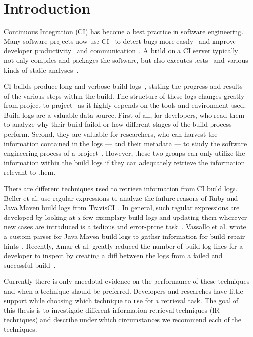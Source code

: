\documentclass[\myrootdir/main.tex]{subfiles}
\begin{document}
\chapter{Introduction}
Continuous Integration (CI) has become a best practice in software engineering.
Many software projects now use CI~\cite{hilton2016usage,staahl2014modeling,beller2017oops} to detect bugs more easily~\cite{vasilescu2015quality,duvall2007continuous} and improve developer productivity~\cite{miller2008hundred,hilton2016usage} and communication~\cite{downs2012ambient}.
A build on a CI server typically not only compiles and packages the software, but also executes tests~\cite{beller2017oops} and various kinds of static analyses~\cite{zampetti2017open}.

CI builds produce long and verbose build logs~\cite{beller2017oops}, stating the progress and results of the various steps within the build.
The structure of these logs changes greatly from project to project~\cite{staahl2014modeling} as it highly depends on the tools and environment used.
Build logs are a valuable data source. First of all, for developers, who read them to analyze why their build failed or how different stages of the build process perform.
Second, they are valuable for researchers, who can harvest the information contained in the logs --- and their metadata --- to study the software engineering process of a project~\cite{rausch2017empirical,beller2017oops,seo2014programmers,vassallo2017a-tale}.
However, these two groups can only utilize the information within the build logs if they can adequately retrieve the information relevant to them.

There are different techniques used to retrieve information from CI build logs. Beller et al. use regular expressions to analyze the failure reasons of Ruby and Java Maven build logs from TravisCI~\cite{beller2017oops}.
In general, such regular expressions are developed by looking at a few exemplary build logs and updating them whenever new cases are introduced is a tedious and error-prone task~\cite{michael2019regexes}.
Vassallo et al. wrote a custom parser for Java Maven build logs to gather information for build repair hints~\cite{vassallo2018un-break}.
Recently, Amar et al. greatly reduced the number of build log lines for a developer to inspect by creating a diff between the logs from a failed and successful build~\cite{amar2019mining}.

Currently there is only anecdotal evidence on the performance of these techniques and when a technique should be preferred.
Developers and researches have little support while choosing which technique to use for a retrieval task.
The goal of this thesis is to investigate different information retrieval techniques (IR techniques) and describe under which circumstances we recommend each of the techniques.
\end{document}

